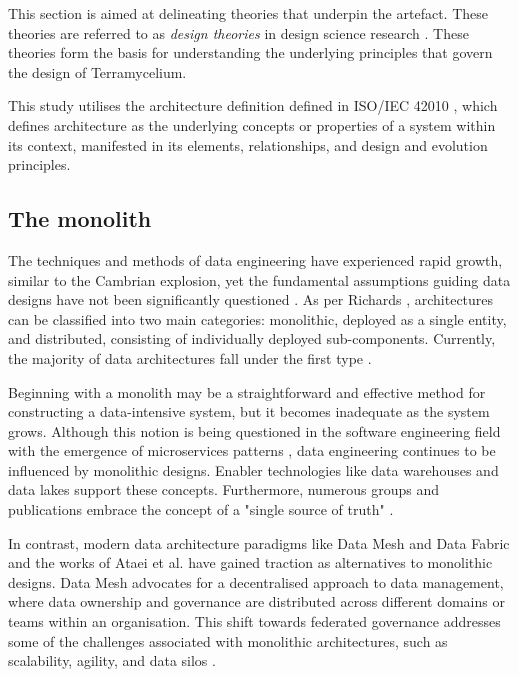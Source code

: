 \documentclass[preprint,12pt]{elsarticle}
\begin{document}
This section is aimed at delineating theories that underpin the artefact. These theories are referred to as \emph{design theories} in design science research \cite{Rose}. These theories form the basis for understanding the underlying principles that govern the design of Terramycelium.

This study utilises the architecture definition defined in ISO/IEC 42010 \cite{ISO42010}, which defines architecture as the underlying concepts or properties of a system within its context, manifested in its elements, relationships, and design and evolution principles.

\subsection{The monolith}

The techniques and methods of data engineering have experienced rapid growth, similar to the Cambrian explosion, yet the fundamental assumptions guiding data designs have not been significantly questioned \cite{DataMesh}. As per Richards \cite{richards2020fundamentals}, architectures can be classified into two main categories: monolithic, deployed as a single entity, and distributed, consisting of individually deployed sub-components. Currently, the majority of data architectures fall under the first type \cite{ataei2022state}. 

Beginning with a monolith may be a straightforward and effective method for constructing a data-intensive system, but it becomes inadequate as the system grows. Although this notion is being questioned in the software engineering field with the emergence of microservices patterns \cite{MicroServicesPatterns}, data engineering continues to be influenced by monolithic designs. Enabler technologies like data warehouses and data lakes support these concepts. Furthermore, numerous groups and publications embrace the concept of a "single source of truth" \cite{ataei2022state}.

In contrast, modern data architecture paradigms like Data Mesh \cite{DataMesh} and Data Fabric \cite{GartnerDataFabric2023} and the works of Ataei et al. \cite{ataei2023towards} have gained traction as alternatives to monolithic designs. Data Mesh advocates for a decentralised approach to data management, where data ownership and governance are distributed across different domains or teams within an organisation. This shift towards federated governance addresses some of the challenges associated with monolithic architectures, such as scalability, agility, and data silos \cite{Bode2023}.
\end{document}

